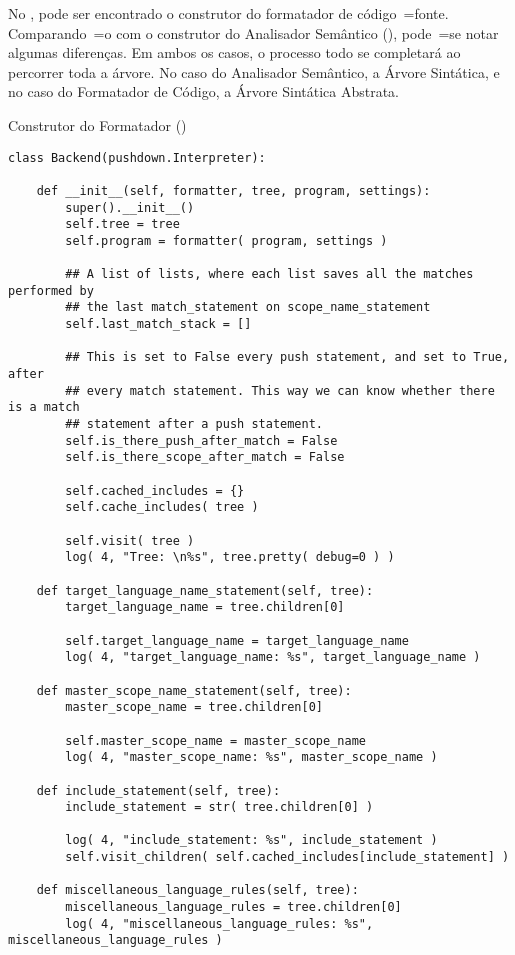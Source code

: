 No ,
pode ser encontrado o construtor do formatador de código~=fonte.
Comparando~=o com o construtor do Analisador Semântico (),
pode~=se notar algumas diferenças.
Em ambos os casos,
o processo todo se completará ao percorrer toda a árvore.
No caso do Analisador Semântico,
a Árvore Sintática,
e no caso do Formatador de Código,
a Árvore Sintática Abstrata.
\begin{code}
\caption[Construtor do Formatador]{Construtor do Formatador ()}
\label{code:construtorDoFormatador}
\begin{verbatim}
class Backend(pushdown.Interpreter):

    def __init__(self, formatter, tree, program, settings):
        super().__init__()
        self.tree = tree
        self.program = formatter( program, settings )

        ## A list of lists, where each list saves all the matches performed by
        ## the last match_statement on scope_name_statement
        self.last_match_stack = []

        ## This is set to False every push statement, and set to True, after
        ## every match statement. This way we can know whether there is a match
        ## statement after a push statement.
        self.is_there_push_after_match = False
        self.is_there_scope_after_match = False

        self.cached_includes = {}
        self.cache_includes( tree )

        self.visit( tree )
        log( 4, "Tree: \n%s", tree.pretty( debug=0 ) )

    def target_language_name_statement(self, tree):
        target_language_name = tree.children[0]

        self.target_language_name = target_language_name
        log( 4, "target_language_name: %s", target_language_name )

    def master_scope_name_statement(self, tree):
        master_scope_name = tree.children[0]

        self.master_scope_name = master_scope_name
        log( 4, "master_scope_name: %s", master_scope_name )

    def include_statement(self, tree):
        include_statement = str( tree.children[0] )

        log( 4, "include_statement: %s", include_statement )
        self.visit_children( self.cached_includes[include_statement] )

    def miscellaneous_language_rules(self, tree):
        miscellaneous_language_rules = tree.children[0]
        log( 4, "miscellaneous_language_rules: %s", miscellaneous_language_rules )
\end{verbatim}
\end{code}

